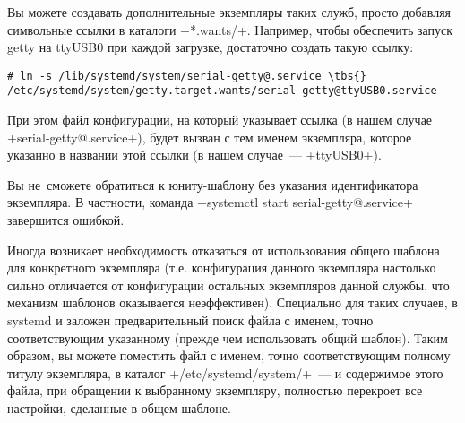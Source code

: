 \documentclass[10pt,oneside,a4paper]{article}
\newcommand{\tbs}{\textbackslash}
\begin{document}
Вы можете создавать дополнительные экземпляры таких служб, просто добавляя
символьные ссылки в каталоги +*.wants/+. Например, чтобы обеспечить запуск getty
на ttyUSB0 при каждой загрузке, достаточно создать такую ссылку:
\begin{Verbatim}[commandchars=\\\{\}]
# ln -s /lib/systemd/system/serial-getty@.service \tbs{}
/etc/systemd/system/getty.target.wants/serial-getty@ttyUSB0.service
\end{Verbatim}
При этом файл конфигурации, на который указывает ссылка (в нашем случае
+serial-getty@.service+), будет вызван с тем именем экземпляра, которое указанно
в названии этой ссылки (в нашем случае~--- +ttyUSB0+).

Вы не~сможете обратиться к юниту-шаблону без указания идентификатора экземпляра.
В частности, команда +systemctl start serial-getty@.service+ завершится ошибкой.

Иногда возникает необходимость отказаться от использования общего шаблона
для конкретного экземпляра (т.е. конфигурация данного экземпляра настолько
сильно отличается от конфигурации остальных экземпляров данной службы, что
механизм шаблонов оказывается неэффективен). Специально для таких случаев, в
systemd и заложен предварительный поиск файла с именем, точно соответствующим
указанному (прежде чем использовать общий шаблон). Таким образом, вы можете
поместить файл с именем, точно соответствующим полному титулу экземпляра, в
каталог +/etc/systemd/system/+~--- и содержимое этого файла, при обращении
к выбранному экземпляру, полностью перекроет все настройки, сделанные в общем
шаблоне.
\end{document}
